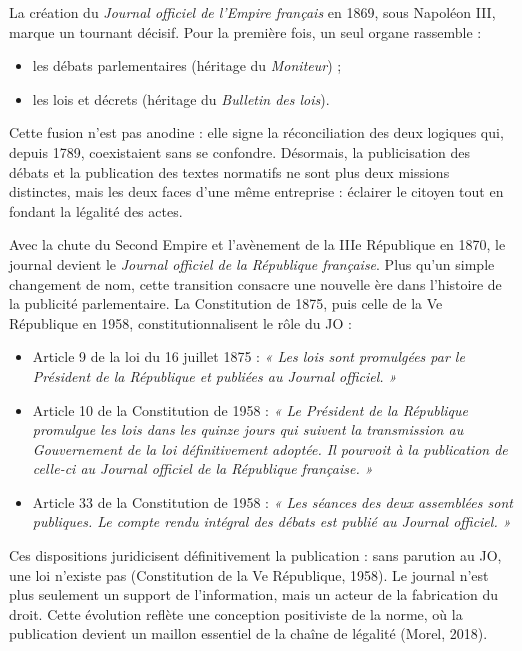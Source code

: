 La création du \emph{Journal officiel de l’Empire français} en 1869, sous Napoléon III, marque un tournant décisif. Pour la première fois, un seul organe rassemble :

\begin{itemize}
\item les débats parlementaires (héritage du \emph{Moniteur}) ;
\item les lois et décrets (héritage du \emph{Bulletin des lois}).

\end{itemize}
Cette fusion n’est pas anodine : elle signe la réconciliation des deux logiques qui, depuis 1789, coexistaient sans se confondre. Désormais, la publicisation des débats et la publication des textes normatifs ne sont plus deux missions distinctes, mais les deux faces d’une même entreprise : éclairer le citoyen tout en fondant la légalité des actes.

Avec la chute du Second Empire et l’avènement de la IIIe République en 1870, le journal devient le \emph{Journal officiel de la République française}. Plus qu’un simple changement de nom, cette transition consacre une nouvelle ère dans l’histoire de la publicité parlementaire. La Constitution de 1875, puis celle de la Ve République en 1958, constitutionnalisent le rôle du JO :

\begin{itemize}
\item Article 9 de la loi du 16 juillet 1875 : \emph{« Les lois sont promulgées par le Président de la République et publiées au Journal officiel. »}
\item Article 10 de la Constitution de 1958 : \emph{« Le Président de la République promulgue les lois dans les quinze jours qui suivent la transmission au Gouvernement de la loi définitivement adoptée. Il pourvoit à la publication de celle-ci au Journal officiel de la République française. »}
\item Article 33 de la Constitution de 1958 : \emph{« Les séances des deux assemblées sont publiques. Le compte rendu intégral des débats est publié au Journal officiel. »}

\end{itemize}
Ces dispositions juridicisent définitivement la publication : sans parution au JO, une loi n’existe pas (Constitution de la Ve République, 1958). Le journal n’est plus seulement un support de l’information, mais un acteur de la fabrication du droit. Cette évolution reflète une conception positiviste de la norme, où la publication devient un maillon essentiel de la chaîne de légalité (Morel, 2018).

